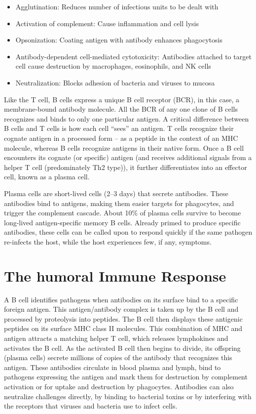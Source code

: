 \begin{itemize}
\tightlist
\item
  Agglutination: Reduces number of infectious units to be dealt with
\item
  Activation of complement: Cause inflammation and cell lysis
\item
  Opsonization: Coating antigen with antibody enhances phagocytosis
\item
  Antibody-dependent cell-mediated cytotoxicity: Antibodies attached to target cell cause destruction by macrophages, eosinophils, and NK cells
\item
  Neutralization: Blocks adhesion of bacteria and viruses to mucosa
\end{itemize}

Like the T cell, B cells express a unique B cell receptor (BCR), in this case, a membrane-bound antibody molecule. All the BCR of any one clone of B cells recognizes and binds to only one particular antigen. A critical difference between B cells and T cells is how each cell ``sees'' an antigen. T cells recognize their cognate antigen in a processed form -- as a peptide in the context of an MHC molecule, whereas B cells recognize antigens in their native form. Once a B cell encounters its cognate (or specific) antigen (and receives additional signals from a helper T cell (predominately Th2 type)), it further differentiates into an effector cell, known as a plasma cell.

Plasma cells are short-lived cells (2--3 days) that secrete antibodies. These antibodies bind to antigens, making them easier targets for phagocytes, and trigger the complement cascade. About 10\% of plasma cells survive to become long-lived antigen-specific memory B cells. Already primed to produce specific antibodies, these cells can be called upon to respond quickly if the same pathogen re-infects the host, while the host experiences few, if any, symptoms.

\hypertarget{the-humoral-immune-response}{%
\section{The humoral Immune Response}\label{the-humoral-immune-response}}

A B cell identifies pathogens when antibodies on its surface bind to a specific foreign antigen. This antigen/antibody complex is taken up by the B cell and processed by proteolysis into peptides. The B cell then displays these antigenic peptides on its surface MHC class II molecules. This combination of MHC and antigen attracts a matching helper T cell, which releases lymphokines and activates the B cell. As the activated B cell then begins to divide, its offspring (plasma cells) secrete millions of copies of the antibody that recognizes this antigen. These antibodies circulate in blood plasma and lymph, bind to pathogens expressing the antigen and mark them for destruction by complement activation or for uptake and destruction by phagocytes. Antibodies can also neutralize challenges directly, by binding to bacterial toxins or by interfering with the receptors that viruses and bacteria use to infect cells.



